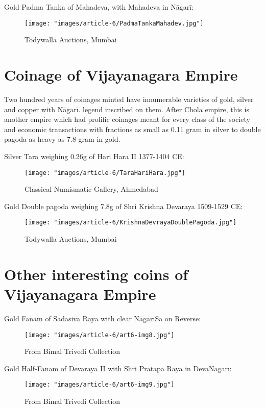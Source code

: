 Gold Padma Tanka of Mahadeva, with Mahadeva in Nāgarī:

\begin{figure}
\texttt{[image: "images/article-6/PadmaTankaMahadev.jpg"]}
\caption{Todywalla Auctions, Mumbai}
\end{figure}


\section*{Coinage of Vijayanagara Empire}

Two hundred years of coinages minted have innumerable varieties of gold, silver and copper with Nāgarī. legend inscribed on them. After Chola empire, this is another empire which had prolific coinages meant for every class of the society and economic transactions with fractions as small as 0.11 gram in silver to double pagoda as heavy as 7.8 gram in gold.

Silver Tara weighing 0.26g of Hari Hara II 1377-1404 CE:

\begin{figure}
\texttt{[image: "images/article-6/TaraHariHara.jpg"]}
\caption{Classical Numismatic Gallery, Ahmedabad}
\end{figure}

Gold Double pagoda weighing 7.8g of Shri Krishna Devaraya 1509-1529 CE:

\begin{figure}
\texttt{[image: "images/article-6/KrishnaDevrayaDoublePagoda.jpg"]}
\caption{Todywalla Auctions, Mumbai}
\end{figure}


\section*{Other interesting coins of Vijayanagara Empire}

Gold Fanam of Sadasiva Raya with clear NāgarīSa on Reverse:

\begin{figure}
\texttt{[image: "images/article-6/art6-img8.jpg"]}
\caption{From Bimal Trivedi Collection}
\end{figure}

Gold Half-Fanam of Devaraya II with Shri Pratapa Raya in DevaNāgarī:

\begin{figure}
\texttt{[image: "images/article-6/art6-img9.jpg"]}
\caption{From Bimal Trivedi Collection}
\end{figure}

